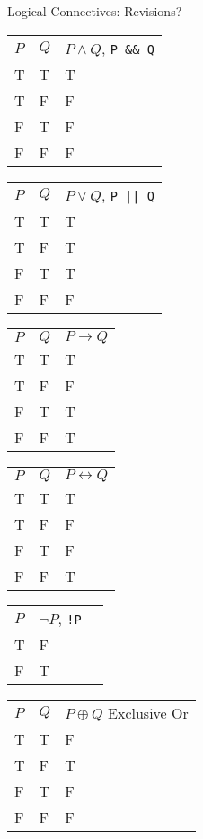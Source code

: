 \documentclass{beamer}
\begin{document}
\begin{frame}[fragile]{Logical Connectives: Revisions?}
  \begin{tabular}{|l|l|l|}
    \hline
   $P$ & $Q$ & $P \land Q$, \verb+P && Q+ \\
    T  & T   & T \\
    T  & F   & F \\
    F  & T   & F \\
    F  & F   & F \\
    \hline
  \end{tabular}
  \begin{tabular}{|l|l|l|}
    \hline
   $P$ & $Q$ & $P \lor Q$, \verb+P || Q+ \\
    T  & T   & T \\
    T  & F   & T \\
    F  & T   & T \\
    F  & F   & F \\
    \hline
  \end{tabular}

  \begin{tabular}{|l|l|l|}
    \hline
   $P$ & $Q$ & $P \rightarrow Q$ \\
    T  & T   & T \\
    T  & F   & F \\
    F  & T   & T \\
    F  & F   & T \\
    \hline
  \end{tabular}
  \begin{tabular}{|l|l|l|}
    \hline
   $P$ & $Q$ & $P \leftrightarrow Q$ \\
    T  & T   & T \\
    T  & F   & F \\
    F  & T   & F \\
    F  & F   & T \\
    \hline
  \end{tabular}
  \begin{tabular}{|l|l|l|}
    \hline
   $P$ & $\neg P$, \verb+!P+ \\
    T  & F \\
    F  & T \\
    \hline
  \end{tabular}

  \begin{tabular}{|l|l|l|}
    \hline
   $P$ & $Q$ & $P \oplus Q$ Exclusive Or \\
    T  & T   & F \\
    T  & F   & T \\
    F  & T   & F \\
    F  & F   & F \\
    \hline
  \end{tabular}
\end{frame}
\end{document}

